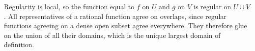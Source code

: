 Regularity is local, so the function equal to $f$ on $U$ and $g$ on $V$ is regular on $U\cup V$. All representatives of a rational function agree on overlaps, since regular functions agreeing on a dense open subset agree everywhere. They therefore glue on the union of all their domains, which is the unique largest domain of definition.
